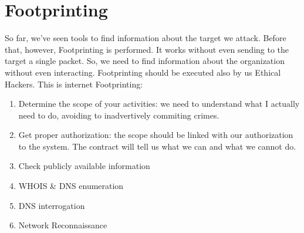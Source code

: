 \section{Footprinting}
So far, we've seen tools to find information about the 
target we attack. Before that, however, Footprinting is 
performed. It works without even sending to the target a 
single packet. So, we need to find information about the 
organization without even interacting. 
Footprinting should be executed also by us Ethical Hackers. 
This is internet Footprinting:
\begin{enumerate}
    \item Determine the scope of your activities: we need to 
    understand what I actually need to do, avoiding to 
    inadvertively commiting crimes. 
    \item Get proper authorization: the scope should be 
    linked with our authorization to the system. The contract 
    will tell us what we can and what we cannot do. 
    \item Check publicly available information
    \item WHOIS \& DNS enumeration 
    \item DNS interrogation 
    \item Network Reconnaissance
\end{enumerate}


